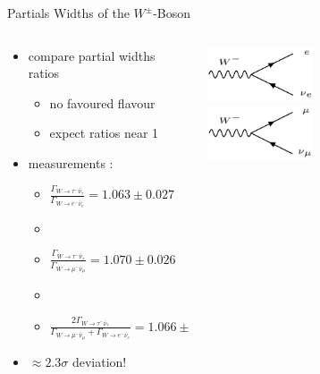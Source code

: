     \begin{frame}{Partials Widths of the $W^{\pm}$-Boson}
        \begin{columns}
            \begin{column}{0.5\textwidth}
              \begin{itemize}
                \item compare partial widths \rightarrow ratios
                \begin{itemize}
                    \item no favoured flavour
                    \item [\rightarrow] expect ratios near 1
                \end{itemize} 
                \item measurements \footnotemark{} :
                \begin{itemize}
                    \item [] < 2, 3, 4, 5> $\frac{\Gamma_{W \rightarrow \tau^- \bar{\nu}_\tau}}{\Gamma_{W \rightarrow e^- \bar{\nu}_e }} = 1.063 \pm 0.027$
                    \item  []
                    \item [] < 3, 4, 5> $\frac{\Gamma_{W \rightarrow \tau^- \bar{\nu}_\tau}}{\Gamma_{W \rightarrow \mu^- \bar{\nu}_\mu }} = 1.070 \pm 0.026$
                    \item []
                    \item [] <4, 5>$\frac{2\Gamma_{W \rightarrow \tau^- \bar{\nu}_\tau}}{\Gamma_{W \rightarrow \mu^- \bar{\nu}_\mu } + \Gamma_{W \rightarrow e^- \bar{\nu}_e }} = 1.066 \pm 0.025$
                \end{itemize}
                \item <5> $\approx 2.3 \sigma $ deviation!
            \end{itemize}
            \end{column}
            \begin{column}{0.5\textwidth}
                \includegraphics[width = 0.42\textwidth]{content/images/Wdecay_e.png} \\
                \includegraphics[width = 0.42\textwidth]{content/images/Wdecay_mu.png} \\

\end{column}
\end{columns}
\end{frame}
